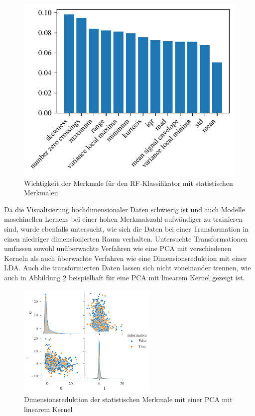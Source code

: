 \begin{figure}[H]
	\centering
	\includegraphics[scale=0.95]{pic/rf-cl-statistical.pdf}
	\caption{Wichtigkeit der Merkmale für den \ac{RF}-Klassifikator mit statistischen Merkmalen}
	\label{fig:rf-statistical-importances}
\end{figure}

Da die Visualisierung hochdimensionaler Daten schwierig ist und auch Modelle maschinellen Lernens bei einer hohen Merkmalszahl aufwändiger zu trainieren sind, wurde ebenfalls untersucht, wie sich die Daten bei einer Transformation in einen niedriger dimensionierten Raum verhalten. Untersuchte Transformationen umfassen sowohl unüberwachte Verfahren wie eine \ac{PCA} mit verschiedenen Kerneln als auch überwachte Verfahren wie eine Dimensionsreduktion mit einer \ac{LDA}. Auch die transformierten Daten lassen sich nicht voneinander trennen, wie auch in Abbildung \ref{fig:dim-red-statistical} beispielhaft für eine \ac{PCA} mit linearem Kernel gezeigt ist.


 \begin{figure}[H] %
 	\centering
 	\includegraphics[width=0.6\textwidth]{pic/statistical-pca-lin.pdf}
	\caption{Dimensionsreduktion der statistischen Merkmale mit einer \ac{PCA} mit linearem Kernel}
	\label{fig:dim-red-statistical}
\end{figure}

